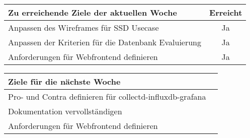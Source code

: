 \begin{tabularx}{\textwidth}{Xc}
    \arrayrulecolor{OliveGreen}
    \toprule
    {\bfseries Zu erreichende Ziele der aktuellen Woche} & {\bfseries Erreicht} \\
    \midrule[2pt]
    Anpassen des Wireframes für SSD Usecase              &Ja                    \\
    \rowcolor{OliveGreen!15}
    Anpassen der Kriterien für die Datenbank Evaluierung &Ja                    \\
    \rowcolor{White}
    Anforderungen für Webfrontend definieren             &Ja                    \\
   \bottomrule[2pt]
\end{tabularx}
%
\vspace{1cm}
%
\begin{tabularx}{\textwidth}{Xc}
    \arrayrulecolor{OliveGreen}
    \toprule
    {\bfseries Ziele für die nächste Woche}              &                      \\
    \midrule[2pt]
    Pro- und Contra definieren für collectd-influxdb-grafana  &                 \\
    \rowcolor{OliveGreen!15}
    Dokumentation vervollständigen                            &                 \\
    \rowcolor{White}
    Anforderungen für Webfrontend definieren                  &                 \\
\end{tabularx}
